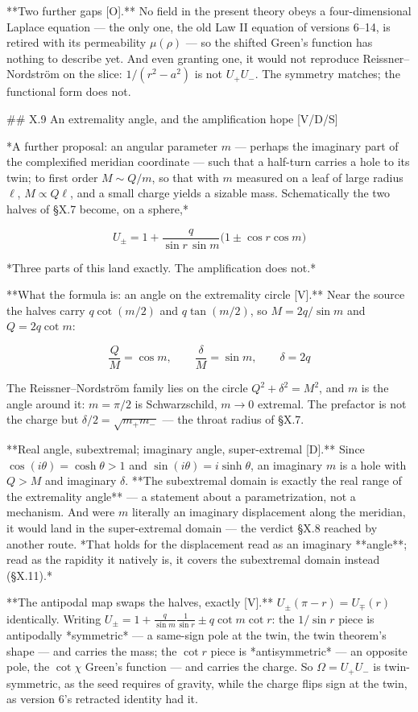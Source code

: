 **Two further gaps [O].** No field in the present theory obeys a four-dimensional Laplace equation — the only one, the old Law II equation of versions 6–14, is retired with its permeability $\mu(\rho)$ — so the shifted Green's function has nothing to describe yet. And even granting one, it would not reproduce Reissner–Nordström on the slice: $1/(r^2-a^2)$ is not $U_+U_-$. The symmetry matches; the functional form does not.

## X.9 An extremality angle, and the amplification hope [V/D/S]

*A further proposal: an angular parameter $m$ — perhaps the imaginary part of the complexified meridian coordinate — such that a half-turn carries a hole to its twin; to first order $M\sim Q/m$, so that with $m$ measured on a leaf of large radius $\ell$, $M\propto Q\ell$, and a small charge yields a sizable mass. Schematically the two halves of §X.7 become, on a sphere,*

$$U_\pm = 1+\frac{q}{\sin r\,\sin m}\big(1\pm\cos r\cos m\big)$$

*Three parts of this land exactly. The amplification does not.*

**What the formula is: an angle on the extremality circle [V].** Near the source the halves carry $q\cot(m/2)$ and $q\tan(m/2)$, so $M = 2q/\sin m$ and $Q = 2q\cot m$:

$$\frac QM = \cos m,\qquad\frac\delta M = \sin m,\qquad\delta = 2q$$

The Reissner–Nordström family lies on the circle $Q^2+\delta^2 = M^2$, and $m$ is the angle around it: $m = \pi/2$ is Schwarzschild, $m\to0$ extremal. The prefactor is not the charge but $\delta/2 = \sqrt{m_+m_-}$ — the throat radius of §X.7.

**Real angle, subextremal; imaginary angle, super-extremal [D].** Since $\cos(i\theta) = \cosh\theta>1$ and $\sin(i\theta) = i\sinh\theta$, an imaginary $m$ is a hole with $Q>M$ and imaginary $\delta$. **The subextremal domain is exactly the real range of the extremality angle** — a statement about a parametrization, not a mechanism. And were $m$ literally an imaginary displacement along the meridian, it would land in the super-extremal domain — the verdict §X.8 reached by another route. *That holds for the displacement read as an imaginary **angle**; read as the rapidity it natively is, it covers the subextremal domain instead (§X.11).*

**The antipodal map swaps the halves, exactly [V].** $U_\pm(\pi-r) = U_\mp(r)$ identically. Writing $U_\pm = 1+\frac{q}{\sin m}\frac{1}{\sin r}\pm q\cot m\cot r$: the $1/\sin r$ piece is antipodally *symmetric* — a same-sign pole at the twin, the twin theorem's shape — and carries the mass; the $\cot r$ piece is *antisymmetric* — an opposite pole, the $\cot\chi$ Green's function — and carries the charge. So $\Omega = U_+U_-$ is twin-symmetric, as the seed requires of gravity, while the charge flips sign at the twin, as version 6's retracted identity had it.

